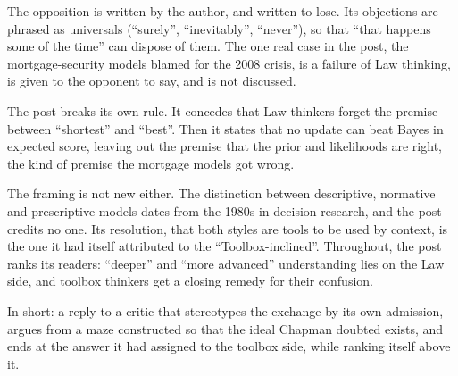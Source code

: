 \begin{afterword}
The opposition is written by the author, and written to lose. Its objections are phrased as universals (``surely'', ``inevitably'', ``never''), so that ``that happens some of the time'' can dispose of them. The one real case in the post, the mortgage-security models blamed for the 2008 crisis, is a failure of Law thinking, is given to the opponent to say, and is not discussed.

The post breaks its own rule. It concedes that Law thinkers forget the premise between ``shortest'' and ``best''. Then it states that no update can beat Bayes in expected score, leaving out the premise that the prior and likelihoods are right, the kind of premise the mortgage models got wrong.

The framing is not new either. The distinction between descriptive, normative and prescriptive models dates from the 1980s in decision research, and the post credits no one. Its resolution, that both styles are tools to be used by context, is the one it had itself attributed to the ``Toolbox-inclined''. Throughout, the post ranks its readers: ``deeper'' and ``more advanced'' understanding lies on the Law side, and toolbox thinkers get a closing remedy for their confusion.

In short: a reply to a critic that stereotypes the exchange by its own admission, argues from a maze constructed so that the ideal Chapman doubted exists, and ends at the answer it had assigned to the toolbox side, while ranking itself above it.
\end{afterword}
